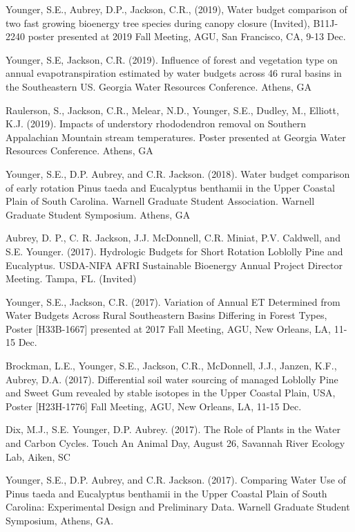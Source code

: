 \documentclass[10pt,letterpaper]{article}
\begin{document}
	\begin{hangparas}{.25in}{1}
		
		Younger, S.E., Aubrey, D.P., Jackson, C.R., (2019), Water budget comparison of two fast growing bioenergy tree species during canopy closure (Invited), B11J-2240 poster presented at 2019 Fall Meeting, AGU, San Francisco, CA, 9-13 Dec.
		
		Younger, S.E, Jackson, C.R. (2019). Influence of forest and vegetation type on annual evapotranspiration estimated by water budgets across 46 rural basins in the Southeastern US. Georgia Water Resources Conference. Athens, GA
		
		Raulerson, S., Jackson, C.R., Melear, N.D., Younger, S.E., Dudley, M., Elliott, K.J. (2019). Impacts of understory rhododendron removal on Southern Appalachian Mountain stream temperatures. Poster presented at Georgia Water Resources Conference. Athens, GA
		
		Younger, S.E., D.P. Aubrey, and C.R. Jackson. (2018). Water budget comparison of early rotation Pinus taeda and Eucalyptus benthamii in the Upper Coastal Plain of South Carolina. Warnell Graduate Student Association. Warnell Graduate Student Symposium. Athens, GA
		
		Aubrey, D. P., C. R. Jackson, J.J. McDonnell, C.R. Miniat, P.V. Caldwell, and S.E. Younger. (2017). Hydrologic Budgets for Short Rotation Loblolly Pine and Eucalyptus. USDA-NIFA AFRI Sustainable Bioenergy Annual Project Director Meeting. Tampa, FL. (Invited)
		
		Younger, S.E., Jackson, C.R. (2017). Variation of Annual ET Determined from Water Budgets Across Rural Southeastern Basins Differing in Forest Types, Poster [H33B-1667] presented at 2017 Fall Meeting, AGU, New Orleans, LA, 11-15 Dec.
		
		Brockman, L.E., Younger, S.E., Jackson, C.R., McDonnell, J.J., Janzen, K.F., Aubrey, D.A. (2017). Differential soil water sourcing of managed Loblolly Pine and Sweet Gum revealed by stable isotopes in the Upper Coastal Plain, USA, Poster [H23H-1776] Fall Meeting, AGU, New Orleans, LA, 11-15 Dec.
		
		Dix, M.J., S.E. Younger, D.P. Aubrey. (2017). The Role of Plants in the Water and Carbon Cycles. Touch An Animal Day, August 26, Savannah River Ecology Lab, Aiken, SC
		
		Younger, S.E., D.P. Aubrey, and C.R. Jackson. (2017). Comparing Water Use of Pinus taeda and Eucalyptus benthamii in the Upper Coastal Plain of South Carolina: Experimental Design and Preliminary Data. Warnell Graduate Student Symposium, Athens, GA. 
		

\end{hangparas}
\end{document}
